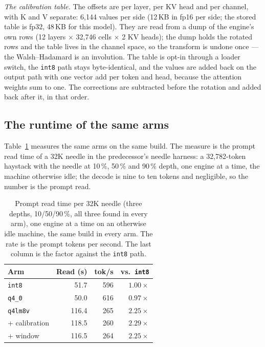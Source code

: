\documentclass[10pt,twocolumn]{article}
\begin{document}
\emph{The calibration table.} The offsets are per layer, per KV head and per channel, with K and V separate: 6,144 values per side (12\,KB in fp16 per side; the stored table is fp32, 48\,KB for this model). They are read from a dump of the engine's own rows (12 layers $\times$ 32,746 cells $\times$ 2 KV heads); the dump holds the rotated rows and the table lives in the channel space, so the transform is undone once --- the Walsh--Hadamard is an involution. The table is opt-in through a loader switch, the \texttt{int8} path stays byte-identical, and the values are added back on the output path with one vector add per token and head, because the attention weights sum to one. The corrections are subtracted before the rotation and added back after it, in that order.

\subsection{The runtime of the same arms}

Table~\ref{tab:runtime} measures the same arms on the same build. The measure is the prompt read time of a 32K needle in the predecessor's needle harness: a 32,782-token haystack with the needle at 10\,\%, 50\,\% and 90\,\% depth, one engine at a time, the machine otherwise idle; the decode is nine to ten tokens and negligible, so the number is the prompt read.

\begin{table}[t]
\centering
\footnotesize
\caption{Prompt read time per 32K needle (three depths, 10/50/90\,\%, all three found in every arm), one engine at a time on an otherwise idle machine, the same build in every arm. The rate is the prompt tokens per second. The last column is the factor against the \texttt{int8} path.}
\label{tab:runtime}
\begin{tabular}{@{}lrrr@{}}
\toprule
Arm & Read (s) & tok/s & vs.\ \texttt{int8} \\
\midrule
\texttt{int8} & 51.7 & 596 & $1.00\times$ \\
\texttt{q4\_0} & 50.0 & 616 & $0.97\times$ \\
\texttt{q4lm8v} & 116.4 & 265 & $2.25\times$ \\
\quad + calibration & 118.5 & 260 & $2.29\times$ \\
\quad + window & 116.5 & 264 & $2.25\times$ \\
\bottomrule
\end{tabular}
\end{table}
\end{document}
